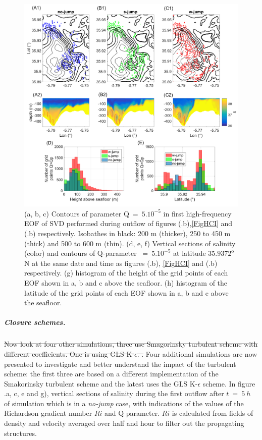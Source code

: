 \begin{figure}[!h]
 \includegraphics[width=\textwidth]{./GBR3D/EOF5_MIV_2D.png}
 \caption {(a, b, c) Contours of parameter Q$\ =\ 5.10^{-5}$ in first high-frequency EOF of SVD performed during outflow of figures (.b),\ref{FigHCI} and (.b) respectively. Isobathes in black: 200 m (thicker), 250 to 450 m (thick) and 500 to 600 m (thin). (d, e, f) Vertical sections of salinity (color) and contours of Q-parameter $\ =\ 5.10^{-5}$ at latitude $35.9372^\text{o}$ N at the same date and time as figures (.b), \ref{FigHCI} and (.b) respectively. (g) histogram of the height of the grid points of each EOF shown in a, b and c above the seafloor. (h) histogram of the latitude of the grid points of each EOF shown in a, b and c above the seafloor.}
 \label{FigEOFMIV}
\end{figure}

\subparagraph{Closure schemes.}

\color{blue}\sout{Now look at four other simulations, three use Smagorinsky turbulent scheme with different coefficients. One is using GLS K-$\epsilon$. .}
Four additional simulations are now presented to investigate and better understand the impact of the turbulent scheme: the first three are based on a different implementation of the Smakorinsky turbulent scheme and the latest uses the GLS K-$\epsilon$ scheme. \color{black}
\color{blue}In figure .a, c, e and g),\color{black} vertical sections of salinity during the first outflow \color{blue}after $t\ =\ 5\ h$ \color{black} of simulation which is in a \textit{no-jump} case, with indications of the values of the Richardson gradient number $Ri$ and Q parameter. $Ri$ is calculated from fields of density and velocity averaged over half and hour to filter out the propagating structures.

